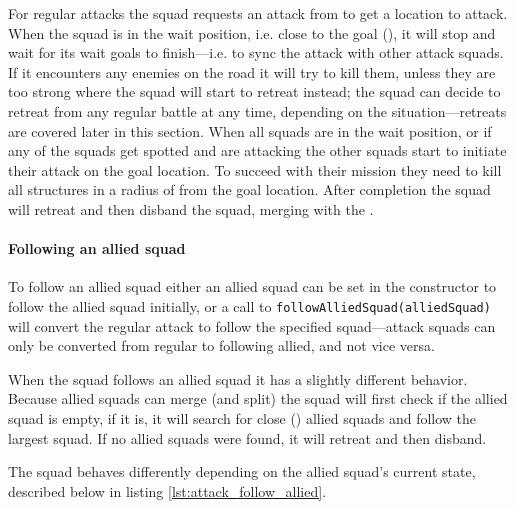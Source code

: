 For regular attacks the squad requests an attack from  to get a location to attack. When the squad is in the wait position, i.e. close to the goal (\squadAttackWaitingPositionDistanceFromGoal), it will stop and wait for its wait goals to finish—i.e. to sync the attack with other attack squads. If it encounters any enemies on the road it will try to kill them, unless they are too strong where the squad will start to retreat instead; the squad can decide to retreat from any regular battle at any time, depending on the situation—retreats are covered later in this section. When all squads are in the wait position, or if any of the squads get spotted and are attacking the other squads start to initiate their attack on the goal location. To succeed with their mission they need to kill all structures in a radius of \squadAttackStructuresDestroyedGoalDistance from the goal location. After completion the squad will retreat and then disband the squad, merging with the .

\paragraph{Following an allied squad}
To follow an allied squad either an allied squad can be set in the constructor to follow the allied squad initially, or a call to \texttt{followAlliedSquad(alliedSquad)} will convert the regular attack to follow the specified squad—attack squads can only be converted from regular to following allied, and not vice versa.

When the squad follows an allied squad it has a slightly different behavior. Because allied squads can merge (and split) the squad will first check if the allied squad is empty, if it is, it will search for close (\squadAttackFindAlliedSquadDistance) allied squads and follow the largest squad. If no allied squads were found, it will retreat and then disband.

The squad behaves differently depending on the allied squad's current state, described below in listing \ref{lst:attack_follow_allied}.

